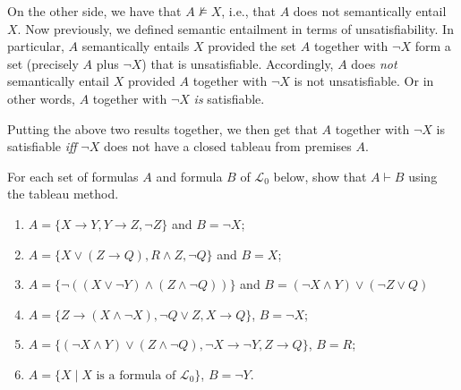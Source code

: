 On the other side, we have that $A \not\models X$, i.e., that $A$ does not semantically entail $X$. Now previously, we defined semantic entailment in terms of unsatisfiability. In particular, $A$ semantically entails $X$ provided the set $A$ together with $\neg X$ form a set (precisely $A$ plus $\neg X$) that is unsatisfiable. Accordingly, $A$ does \textit{not} semantically entail $X$ provided $A$ together with $\neg X$ is not unsatisfiable. Or in other words, $A$ together with $\neg X$ \textit{is} satisfiable.

Putting the above two results together, we then get that $A$ together with $\neg X$ is satisfiable \textit{iff} $\neg X$ does not have a closed tableau from premises $A$. 

\begin{exc}
For each set of formulas $A$ and formula $B$ of $\mathcal{L}_0$ below, show that $A \vdash B$ using the tableau method. 

\begin{enumerate}
	\item $A=\{X \rightarrow Y, Y \rightarrow Z, \neg Z\}$ and $B=\neg X$;
	\item $A=\{X \vee (Z \rightarrow Q), R \wedge Z, \neg Q\}$ and $B=X$;
	\item $A=\{\neg ((X \vee \neg Y) \wedge (Z \wedge \neg Q))\}$ and $B=(\neg X \wedge Y) \vee (\neg Z \vee Q)$
	\item $A=\{Z \rightarrow (X \wedge \neg X), \neg Q \vee Z, X \rightarrow Q\}$, $B=\neg X$;
	\item $A=\{(\neg X \wedge Y) \vee (Z \wedge \neg Q), \neg X \rightarrow \neg Y, Z \rightarrow Q\}$, $B=R$;
	\item $A=\{X \mid X\text{ is a formula of }\mathcal{L}_0\}$, $B=\neg Y$.
	\end{enumerate} 
\end{exc}
